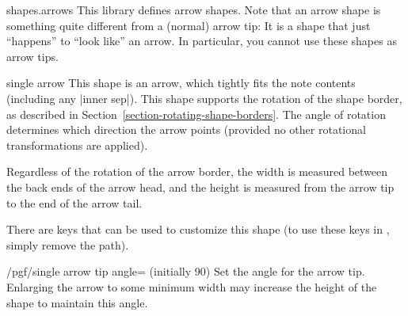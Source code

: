 \begin{pgflibrary}{shapes.arrows}
  This library defines arrow shapes. Note that an arrow shape is
  something quite different from a (normal) arrow tip: It is a shape
  that just ``happens'' to ``look like'' an arrow. In particular, you
  cannot use these shapes as arrow tips.
\end{pgflibrary}

\begin{shape}{single arrow}
	This shape is an arrow, which tightly fits the note contents
	(including any |inner sep|).
	This shape supports the rotation of the shape border, as
	described in Section~\ref{section-rotating-shape-borders}.
	The angle of rotation determines which direction the arrow
	points (provided no other rotational transformations are applied).
	
\begin{codeexample}[]
\end{codeexample}

	Regardless of the rotation of the arrow border, the width is
  measured between the back ends of the arrow head, and the
  height is measured from the arrow tip to the end of the arrow
  tail.

\begin{codeexample}[]
\end{codeexample}

	There are \pgfname{} keys that can be used to customize this shape (to
	use these keys in \tikzname{}, simply remove the 
	path).
	
\begin{key}{/pgf/single arrow tip angle= (initially 90)}
  Set the angle for the arrow tip. Enlarging the arrow to some
  minimum width may increase the height of the shape to maintain
  this angle.
\end{key}


\end{shape}
